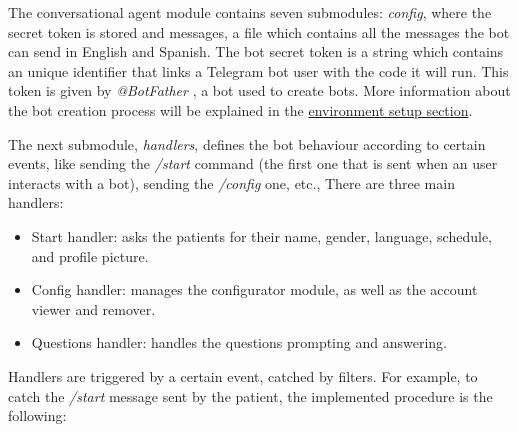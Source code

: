 \documentclass[12pt,english]{article}
\begin{document}
The conversational agent module contains seven submodules: \emph{config}, where the secret token is stored and messages, a file which contains all the messages the bot can send in English and Spanish. The bot secret token is a string which contains an unique identifier that links a Telegram bot user with the code it will run. This token is given by \emph{@BotFather} \cite{botfather}, a bot used to create bots. More information about the bot creation process will be explained in the \hyperref[sec:env_setup]{environment setup section}.

The next submodule, \emph{handlers}, defines the bot behaviour according to certain events, like sending the \emph{/start} command (the first one that is sent when an user interacts with a bot), sending the {\emph{/config}} one, etc., There are three main handlers:
\begin{itemize}
  \item Start handler: asks the patients for their name, gender, language, schedule, and profile picture.
  \item Config handler: manages the configurator module, as well as the account viewer and remover.
  \item Questions handler: handles the questions prompting and answering.
\end{itemize}

Handlers are triggered by a certain event, catched by filters. For example, to catch the \emph{/start} message sent by the patient, the implemented procedure is the following:
\end{document}
